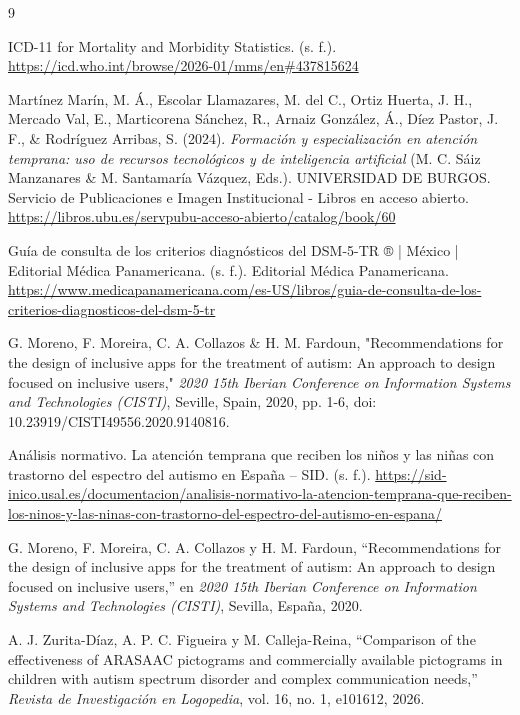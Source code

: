 \documentclass{article}
\begin{document}
\begin{thebibliography}{9}

ICD-11 for Mortality and Morbidity Statistics. (s. f.). \url{https://icd.who.int/browse/2026-01/mms/en#437815624}

Martínez Marín, M. Á., Escolar Llamazares, M. del C., Ortiz Huerta, J. H., Mercado Val, E., Marticorena Sánchez, R., Arnaiz González, Á., Díez Pastor, J. F., \& Rodríguez Arribas, S. (2024). \textit{Formación y especialización en atención temprana: uso de recursos tecnológicos y de inteligencia artificial} (M. C. Sáiz Manzanares \& M. Santamaría Vázquez, Eds.). UNIVERSIDAD DE BURGOS. Servicio de Publicaciones e Imagen Institucional - Libros en acceso abierto. \url{https://libros.ubu.es/servpubu-acceso-abierto/catalog/book/60}

Guía de consulta de los criterios diagnósticos del DSM-5-TR ® | México | Editorial Médica Panamericana. (s. f.). Editorial Médica Panamericana. \url{https://www.medicapanamericana.com/es-US/libros/guia-de-consulta-de-los-criterios-diagnosticos-del-dsm-5-tr}

G. Moreno, F. Moreira, C. A. Collazos \& H. M. Fardoun, "Recommendations for the design of inclusive apps for the treatment of autism: An approach to design focused on inclusive users," \textit{2020 15th Iberian Conference on Information Systems and Technologies (CISTI)}, Seville, Spain, 2020, pp. 1-6, doi: 10.23919/CISTI49556.2020.9140816.

Análisis normativo. La atención temprana que reciben los niños y las niñas con trastorno del espectro del autismo en España – SID. (s. f.). \url{https://sid-inico.usal.es/documentacion/analisis-normativo-la-atencion-temprana-que-reciben-los-ninos-y-las-ninas-con-trastorno-del-espectro-del-autismo-en-espana/}

G. Moreno, F. Moreira, C. A. Collazos y H. M. Fardoun,
``Recommendations for the design of inclusive apps for the treatment of autism: An approach to design focused on inclusive users,''
en \textit{2020 15th Iberian Conference on Information Systems and Technologies (CISTI)}, Sevilla, España, 2020.

A. J. Zurita-Díaz, A. P. C. Figueira y M. Calleja-Reina,
``Comparison of the effectiveness of ARASAAC pictograms and commercially available pictograms in children with autism spectrum disorder and complex communication needs,''
\textit{Revista de Investigación en Logopedia}, vol. 16, no. 1, e101612, 2026.

\end{thebibliography}
\end{document}
